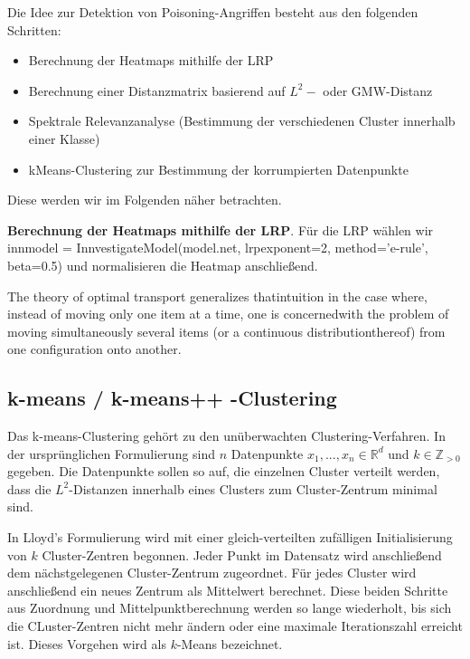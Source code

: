 \documentclass[11pt,a4paper]{article}
\numberwithin{equation}{section}
\begin{document}
	Die Idee zur Detektion von Poisoning-Angriffen besteht aus den folgenden Schritten:
	
	\begin{itemize}
		\item Berechnung der Heatmaps mithilfe der LRP
		\item Berechnung einer Distanzmatrix basierend auf $L^2-$ oder GMW-Distanz
		\item Spektrale Relevanzanalyse (Bestimmung der verschiedenen Cluster innerhalb einer Klasse)
		\item kMeans-Clustering zur Bestimmung der korrumpierten Datenpunkte
	\end{itemize}

	Diese werden wir im Folgenden näher betrachten.
	
	\noindent\textbf{Berechnung der Heatmaps mithilfe der LRP}.	Für die LRP wählen wir innmodel = InnvestigateModel(model.net, lrpexponent=2,
	method='e-rule', beta=0.5) und normalisieren die Heatmap anschließend.
	
	
	
	The theory of optimal transport generalizes thatintuition in the case where, instead of moving only one item at a time, one is concernedwith the problem of moving simultaneously several items (or a continuous distributionthereof) from one configuration onto another.\cite{computationalOT}
	\subsection{k-means / k-means++ -Clustering}
	Das k-means-Clustering gehört zu den unüberwachten Clustering-Verfahren. In der ursprünglichen Formulierung sind $n$ Datenpunkte $x_1,...,x_n \in \mathbb{R}^d$ und $k \in \mathbb{Z}_{>0}$ gegeben. Die Datenpunkte sollen so auf, die einzelnen Cluster verteilt werden, dass die $L^2$-Distanzen innerhalb eines Clusters zum Cluster-Zentrum minimal sind. 
	
	
	In Lloyd's Formulierung \cite{lloyd1982least} wird mit einer gleich-verteilten zufälligen Initialisierung von $k$ Cluster-Zentren begonnen. Jeder Punkt im Datensatz wird anschließend dem nächstgelegenen Cluster-Zentrum zugeordnet. Für jedes Cluster wird anschließend ein neues Zentrum als Mittelwert berechnet.
	Diese beiden Schritte aus Zuordnung und Mittelpunktberechnung werden so lange wiederholt, bis sich die CLuster-Zentren nicht mehr ändern oder eine maximale Iterationszahl erreicht ist. Dieses Vorgehen wird als $k$-Means bezeichnet.
	
\end{document}
